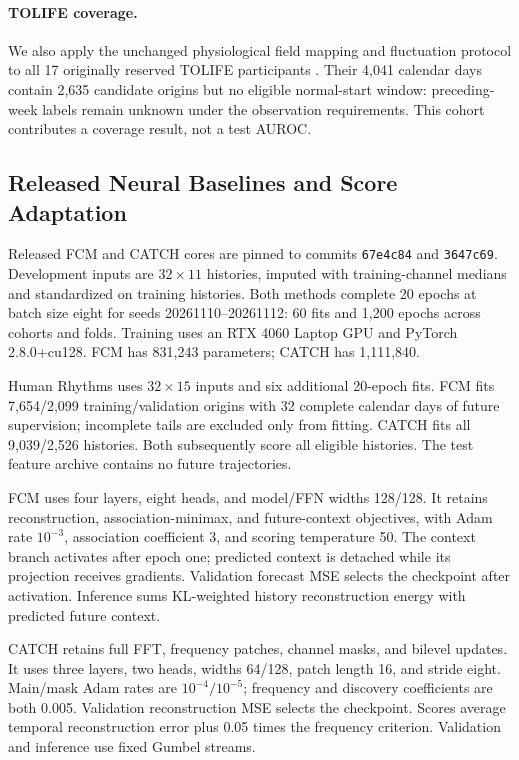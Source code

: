 \paragraph{TOLIFE coverage.}
We also apply the unchanged physiological field mapping and fluctuation protocol to all 17 originally reserved TOLIFE participants \citep{hneD01}. Their 4,041 calendar days contain 2,635 candidate origins but no eligible normal-start window: preceding-week labels remain unknown under the observation requirements. This cohort contributes a coverage result, not a test AUROC.

\subsection{Released Neural Baselines and Score Adaptation}
Released FCM and CATCH cores \citep{hneH01,hneC01} are pinned to commits \texttt{67e4c84} and \texttt{3647c69}. Development inputs are $32\times11$ histories, imputed with training-channel medians and standardized on training histories. Both methods complete 20 epochs at batch size eight for seeds 20261110--20261112: 60 fits and 1,200 epochs across cohorts and folds. Training uses an RTX 4060 Laptop GPU and PyTorch 2.8.0+cu128. FCM has 831,243 parameters; CATCH has 1,111,840.

Human Rhythms uses $32\times15$ inputs and six additional 20-epoch fits. FCM fits 7,654/2,099 training/validation origins with 32 complete calendar days of future supervision; incomplete tails are excluded only from fitting. CATCH fits all 9,039/2,526 histories. Both subsequently score all eligible histories. The test feature archive contains no future trajectories.

FCM uses four layers, eight heads, and model/FFN widths 128/128. It retains reconstruction, association-minimax, and future-context objectives, with Adam rate $10^{-3}$, association coefficient 3, and scoring temperature 50. The context branch activates after epoch one; predicted context is detached while its projection receives gradients. Validation forecast MSE selects the checkpoint after activation. Inference sums KL-weighted history reconstruction energy with predicted future context.

CATCH retains full FFT, frequency patches, channel masks, and bilevel updates. It uses three layers, two heads, widths 64/128, patch length 16, and stride eight. Main/mask Adam rates are $10^{-4}/10^{-5}$; frequency and discovery coefficients are both 0.005. Validation reconstruction MSE selects the checkpoint. Scores average temporal reconstruction error plus 0.05 times the frequency criterion. Validation and inference use fixed Gumbel streams.

